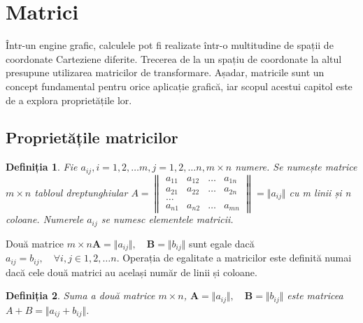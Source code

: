 \section{Matrici}
\label{ch1:sec_matrix}

Într-un engine grafic, calculele pot fi realizate într-o multitudine de spații
de coordonate Carteziene diferite. Trecerea de la un spațiu de coordonate la
altul presupune utilizarea matricilor de transformare. Așadar, matricile sunt un
concept fundamental pentru orice aplicație grafică, iar scopul acestui capitol
este de a explora proprietățile lor.

\subsection{Proprietățile matricilor}
\label{ch1:sec_matrix:sub_matrix_properties}

\newtheorem{th_matrixdef}{Definiția}
\begin{th_matrixdef}
Fie $a_{ij}, i = 1, 2, \dots m, j = 1, 2, \dots n, m \times n$ numere. Se
numește matrice $m \times n$ tabloul dreptunghiular
$
A =
\begin{Vmatrix}
a_{11} & a_{12} & \dots & a_{1n} \\
a_{21} & a_{22} & \dots & a_{2n} \\
\dots \\
a_{n1} & a_{n2} & \dots & a_{mn}
\end{Vmatrix} = \Vert a_{ij} \Vert
$ cu m linii și n coloane. Numerele $a_{ij}$ se numesc elementele matricii.
\end{th_matrixdef}

Două matrice $m \times n \mathbf{A} = \Vert a_{ij} \Vert, \quad 
\mathbf{B} = \Vert b_{ij} \Vert$ sunt egale dacă $a_{ij} = b_{ij}, \quad 
\forall i,j \in {1, 2, \dots n}$. Operația de egalitate a matricilor este
definită numai dacă cele două matrici au același număr de linii și coloane.

\newtheorem{th_matrixadd}[th_matrixdef]{Definiția}
\begin{th_matrixadd}
Suma a două matrice $m \times n$, $\mathbf{A} = \Vert a_{ij} \Vert, \quad
\mathbf{B} = \Vert b_{ij} \Vert$ este matricea $A + B = \Vert a_{ij} + b_{ij}
\Vert$.
\end{th_matrixadd}

